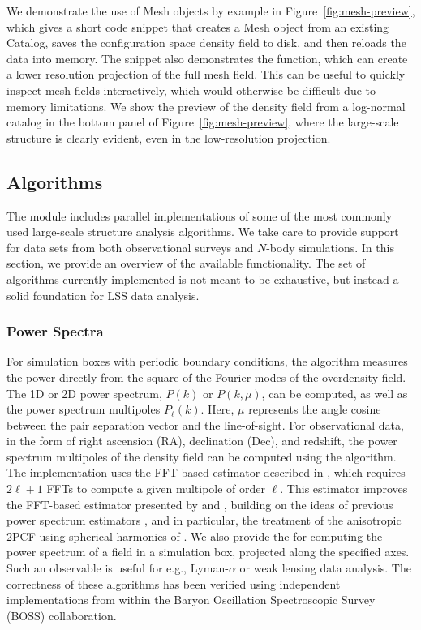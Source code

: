 We demonstrate the use of Mesh objects by example in
Figure~\ref{fig:mesh-preview}, which gives a short code snippet that
creates a Mesh object from an existing Catalog,
saves the configuration space density field to disk, and then reloads
the data into memory. The snippet also demonstrates the 
function, which can create a lower resolution projection of the full mesh
field. This can be useful to quickly inspect mesh fields interactively, which
would otherwise be difficult due to memory limitations. We show the
preview of the density field from a log-normal catalog in the bottom
panel of Figure~\ref{fig:mesh-preview}, where the large-scale
structure is clearly evident, even in the low-resolution projection.


\subsection{Algorithms}
\label{sec:algorithm-details}

The  module includes parallel
implementations of some of the most commonly used large-scale structure
analysis algorithms. We take care to provide support for data sets from
both observational
surveys and $N$-body simulations. In this section, we provide an
overview of the available functionality.
The set of algorithms currently implemented is not meant to be
exhaustive, but instead a solid foundation for LSS data analysis.

\subsubsection{Power Spectra}

For simulation boxes with periodic boundary conditions,
the  algorithm measures the power directly from
the square of the Fourier modes of the overdensity field. The 1D or 2D
power spectrum, $P(k)$ or $P(k,\mu)$, can be computed, as well as the
power spectrum multipoles $P_\ell(k)$. Here, $\mu$ represents the
angle cosine between the pair separation vector and the line-of-sight.
For observational data, in the
form of right ascension (RA), declination (Dec), and redshift, the power spectrum
multipoles of the density field can be computed using the
 algorithm. The implementation uses
the FFT-based estimator described in \citet{Hand:2017}, which requires
$2\ell+1$ FFTs to compute a given multipole of order $\ell$. This estimator
improves the FFT-based estimator presented by
\citet{Bianchi:2015} and \citet{Scoccimarro:2015}, building on the ideas of
previous power spectrum estimators \citep{Feldman:1994,Yamamoto:2006},
and in particular, the treatment of the anisotropic 2PCF using
spherical harmonics of \citet{Slepian:2015}.
We also provide the  for computing
the power spectrum of a field in a simulation box, projected along the
specified axes. Such an observable is useful for e.g., Lyman-$\alpha$ or
weak lensing data analysis. The correctness of these algorithms has been
verified using independent implementations
from within the Baryon Oscillation Spectroscopic Survey (BOSS) collaboration.


